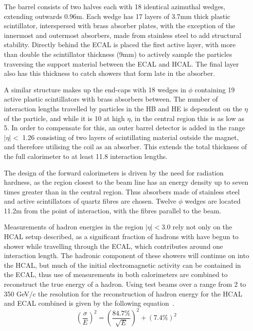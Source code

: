 The barrel consists of two halves each with 18 identical azimuthal wedges, extending outwards 0.96m. Each wedge has 17 layers of 3.7mm thick plastic scintillator, interspersed with brass absorber plates, with the exception of the innermost and outermost absorbers, made from stainless steel to add structural stability. Directly behind the ECAL is placed the first active layer, with more than double the scintillator thickness (9mm) to actively sample the particles traversing the support material between the ECAL and HCAL. The final layer also has this thickness to catch showers that form late in the absorber. 

A similar structure makes up the end-caps with 18 wedges in $\phi$ containing 19 active plastic scintillators with brass absorbers between. The number of interaction lengths travelled by particles in the HB and HE is dependent on the $\eta$ of the particle, and while it is 10 at high $\eta$, in the central region this is as low as 5. In order to compensate for this, an outer barrel detector is added in the range $|\eta| <$ 1.26 consisting of two layers of scintillating material outside the magnet, and therefore utilising the coil as an absorber. This extends the total thickness of the full calorimeter to at least 11.8 interaction lengths. 

The design of the forward calorimeters is driven by the need for radiation hardness, as the region closest to the beam line has an energy density up to seven times greater than in the central region. Thus absorbers made of stainless steel and active scintillators of quartz fibres are chosen. Twelve $\phi$ wedges are located 11.2m from the point of interaction, with the fibres parallel to the beam.

Measurements of hadron energies in the region $| \eta| < 3.0$ rely not only on the HCAL setup described, as a significant fraction of hadrons with have begun to shower while travelling through the ECAL, which contributes around one interaction length.  The hadronic component of these showers will continue on into the HCAL, but much of the initial electromagnetic activity can be contained in the ECAL, thus use of measurements in both calorimeters are combined to reconstruct the true energy of a hadron. Using test beams over a range from 2 to 350 GeV/c the resolution for the reconstruction of hadron energy for the HCAL and ECAL combined is given by the following equation~\cite{HCALTestBeam}.
\begin{equation} 
\left(\frac{\sigma}{E}\right)^2 = \left(\frac{84.7\%}{\sqrt{E}}\right)^2 + \left(7.4\% \right)^2 
\label{eq:H-Res}
\end{equation}





